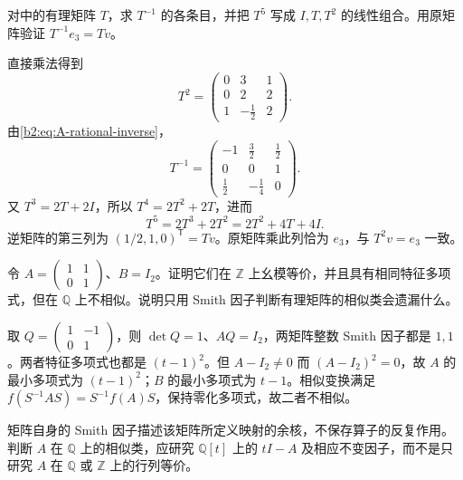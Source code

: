 \begin{exercise}\label{b2:ex:A-rational-powers}
	对中的有理矩阵 \(T\)，求 \(T^{-1}\) 的各条目，并把 \(T^5\) 写成 \(I,T,T^2\) 的线性组合。用原矩阵验证 \(T^{-1}e_3=Tv\)。
\end{exercise}
\begin{solution}
	直接乘法得到
	\[
		T^2=\begin{pmatrix}0&3&1\\0&2&2\\1&-\tfrac12&2\end{pmatrix}.
	\]
	由\eqref{b2:eq:A-rational-inverse}，
	\[
		T^{-1}=\begin{pmatrix}-1&\tfrac32&\tfrac12\\0&0&1\\\tfrac12&-\tfrac14&0\end{pmatrix}.
	\]
	又 \(T^3=2T+2I\)，所以 \(T^4=2T^2+2T\)，进而
	\[
		T^5=2T^3+2T^2=2T^2+4T+4I.
	\]
	逆矩阵的第三列为 \((1/2,1,0)^{\mathsf T}=Tv\)。原矩阵乘此列恰为 \(e_3\)，与 \(T^2v=e_3\) 一致。
\end{solution}

\begin{exercise}\label{b2:ex:A-equivalence-not-similarity}
	令 \(A=\begin{pmatrix}1&1\\0&1\end{pmatrix}\)、\(B=I_2\)。证明它们在 \(\mathbb Z\) 上幺模等价，并且具有相同特征多项式，但在 \(\mathbb Q\) 上不相似。说明只用 Smith 因子判断有理矩阵的相似类会遗漏什么。
\end{exercise}
\begin{solution}
	取 \(Q=\begin{pmatrix}1&-1\\0&1\end{pmatrix}\)，则 \(\det Q=1\)、\(AQ=I_2\)，两矩阵整数 Smith 因子都是 \(1,1\)。两者特征多项式也都是 \((t-1)^2\)。但 \(A-I_2\ne0\) 而 \((A-I_2)^2=0\)，故 \(A\) 的最小多项式为 \((t-1)^2\)；\(B\) 的最小多项式为 \(t-1\)。相似变换满足 \(f(S^{-1}AS)=S^{-1}f(A)S\)，保持零化多项式，故二者不相似。

	矩阵自身的 Smith 因子描述该矩阵所定义映射的余核，不保存算子的反复作用。判断 \(A\) 在 \(\mathbb Q\) 上的相似类，应研究 \(\mathbb Q[t]\) 上的 \(tI-A\) 及相应不变因子，而不是只研究 \(A\) 在 \(\mathbb Q\) 或 \(\mathbb Z\) 上的行列等价。
\end{solution}

